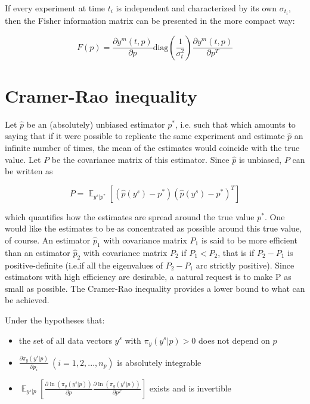 \documentclass[]{scrartcl}
\begin{document}
If every experiment at time $t_i$ is independent and characterized by its own $\sigma_{t_i}$, then the Fisher information matrix can be presented in the more compact way:

\begin{equation}
	F(p) = \frac{\partial y^m(t, p)}{\partial p} \text{diag}\left(\frac{1}{\sigma_{t}^2}\right) \frac{\partial y^m(t, p)}{\partial p^T} 
\end{equation}

\section{Cramer-Rao inequality}

Let $\hat{p}$ be an (absolutely) unbiased estimator $p^*$, i.e. such that which amounts to saying that if it were possible to replicate the same experiment and
estimate $\hat{p}$ an infinite number of times, the mean of the estimates would coincide with the true value. Let $P$ be the covariance matrix of this estimator. Since $\hat{p}$ is unbiased, $P$ can be written as

\begin{equation}
	P = \mathop{\mathbb{E}}_{y^s|p^*} \left[ \left( \hat{p}(y^s) - p^* \right) \left( \hat{p}(y^s) - p^* \right)^T \right]
\end{equation}

which quantifies how the estimates are spread around the true value $p^*$. One would like the estimates to be as concentrated as possible around this true value, of course. An estimator $\hat{p}_1$ with covariance matrix $P_1$ is said to be more efficient than an estimator $\hat{p}_2$ with covariance matrix $P_2$ if $P_1 < P_2$, that is if $P_2 - P_1$ is positive-definite (i.e.if all the eigenvalues of $P_2-P_1$ arc strictly positive). Since estimators with high efficiency are desirable, a natural request is to make P as small as possible. The Cramer-Rao inequality provides a lower bound to what can be achieved.

Under the hypotheses that:

\begin{itemize}
	\item the set of all data vectors $y^s$ with $\pi_y(y^s|p) > 0$ does not depend on $p$
	\item $\frac{\partial \pi_y(y^s|p)}{\partial p_i}~\left(i=1,2,...,n_p\right)$ is absolutely integrable
	\item $\mathop{\mathbb{E}}_{y^s|p} \left[ \frac{\partial \ln (\pi_y (y^s|p))}{\partial p} \frac{\partial \ln (\pi_y (y^s|p))}{\partial p^T} \right]$ exists and is invertible
\end{itemize}
\end{document}
